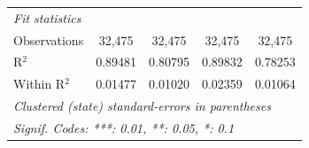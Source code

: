 \begin{tabular}{lcccc}
   \midrule
   \emph{Fit statistics}\\
   Observations                                    & 32,475             & 32,475                    & 32,475                 & 32,475\\  
   R$^2$                                           & 0.89481            & 0.80795                   & 0.89832                & 0.78253\\  
   Within R$^2$                                    & 0.01477            & 0.01020                   & 0.02359                & 0.01064\\  
   \midrule \midrule
   \multicolumn{5}{l}{\emph{Clustered (state) standard-errors in parentheses}}\\
   \multicolumn{5}{l}{\emph{Signif. Codes: ***: 0.01, **: 0.05, *: 0.1}}\\
\end{tabular}
\par\endgroup


